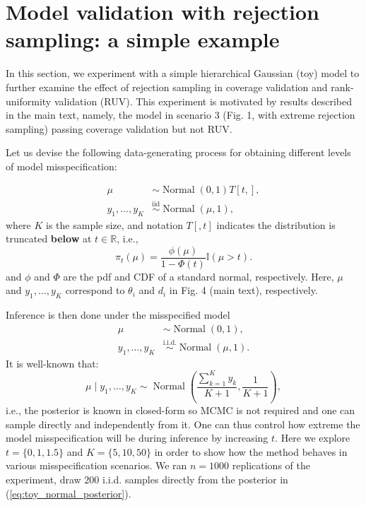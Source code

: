 \documentclass[oneside]{article}
\begin{document}
\newpage
\section{Model validation with rejection sampling: a simple example}
\label{sec:supp_toy}

In this section, we experiment with a simple hierarchical Gaussian (toy) model to further examine the effect of rejection sampling in coverage validation and
rank-uniformity validation (RUV).
This experiment is motivated by results described in the main text, namely, the model in scenario 3 (Fig. 1, with extreme rejection sampling) passing coverage validation but not RUV.

Let us devise the following data-generating process for obtaining different levels of model misspecification:

\begin{align*}
 \mu & \sim \operatorname{Normal}\left(0, 1\right)T[t, ],\\
  y_1, \ldots, y_K & \overset{\text{iid}}{\sim} \operatorname{Normal}\left(\mu, 1\right),
\end{align*}
where $K$ is the sample size, and notation $T[, t]$ indicates the distribution is truncated \textbf{below} at $t \in \mathbb{R}$, i.e.,
\begin{equation*}
    \pi_{t}(\mu) = \frac{\phi(\mu)}{1 - \Phi(t)} \mathbb{I}(\mu > t).
\end{equation*}
and $\phi$ and $\Phi$ are the pdf and CDF of a standard normal, respectively.
Here, $\mu$ and $y_1, \ldots, y_K$ correspond to $\theta_i$ and $d_i$ in Fig. 4 (main text), respectively.

Inference is then done under the misspecified model
\begin{align*}
 \mu & \sim \operatorname{Normal}\left(0, 1\right),\\
  y_1, \ldots, y_K & \overset{\text{i.i.d.}}{\sim} \operatorname{Normal}\left(\mu, 1\right).
\end{align*}
It is well-known that:
\begin{equation}
\label{eq:toy_normal_posterior}
    \mu \mid y_1, \ldots, y_K \sim \operatorname{Normal}\left( \frac{\sum_{k = 1}^K y_k}{K + 1},  \frac{1}{K + 1} \right),
\end{equation}
i.e., the posterior is known in closed-form so MCMC is not required and one can sample directly and independently from it.
One can thus control how extreme the model misspecification will be during inference by increasing $t$.
Here we explore $t =  \{0, 1, 1.5\}$ and $K = \{5, 10 , 50\}$ in order to show how the method behaves in various misspecification scenarios.
We ran $n=1000$ replications of the experiment, draw $200$ i.i.d. samples directly from the posterior in (\ref{eq:toy_normal_posterior}).
\end{document}
